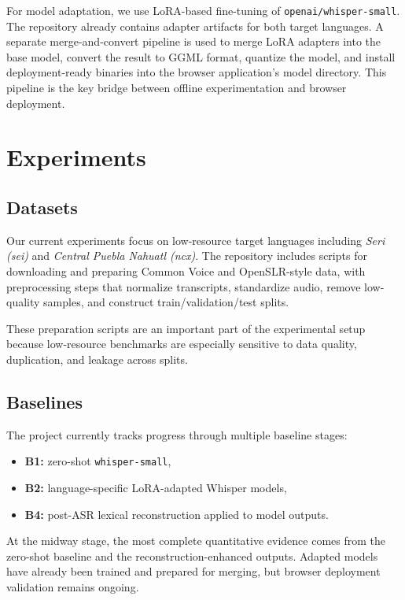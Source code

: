 \documentclass[11pt]{article}
\begin{document}
For model adaptation, we use LoRA-based fine-tuning of \texttt{openai/whisper-small}. The repository already contains adapter artifacts for both target languages. A separate merge-and-convert pipeline is used to merge LoRA adapters into the base model, convert the result to GGML format, quantize the model, and install deployment-ready binaries into the browser application's model directory. This pipeline is the key bridge between offline experimentation and browser deployment.

\section{Experiments}

\subsection{Datasets}
Our current experiments focus on low-resource target languages including \textit{Seri (sei)} and \textit{Central Puebla Nahuatl (ncx)}. The repository includes scripts for downloading and preparing Common Voice and OpenSLR-style data, with preprocessing steps that normalize transcripts, standardize audio, remove low-quality samples, and construct train/validation/test splits.

These preparation scripts are an important part of the experimental setup because low-resource benchmarks are especially sensitive to data quality, duplication, and leakage across splits.

\subsection{Baselines}
The project currently tracks progress through multiple baseline stages:
\begin{itemize}
    \item \textbf{B1:} zero-shot \texttt{whisper-small},
    \item \textbf{B2:} language-specific LoRA-adapted Whisper models,
    \item \textbf{B4:} post-ASR lexical reconstruction applied to model outputs.
\end{itemize}

At the midway stage, the most complete quantitative evidence comes from the zero-shot baseline and the reconstruction-enhanced outputs. Adapted models have already been trained and prepared for merging, but browser deployment validation remains ongoing.
\end{document}
